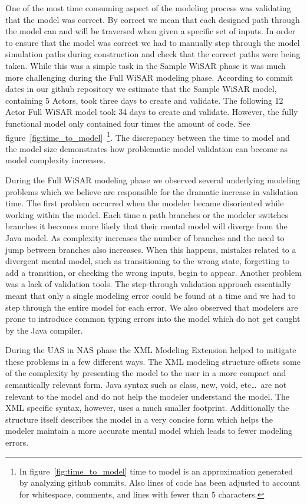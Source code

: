 One of the most time consuming aspect of the modeling process was validating that the model was correct.  By correct we mean that each designed path through the model can and will be traversed when given a specific set of inputs.  In order to ensure that the model was correct we had to manually step through the model simulation paths during construction and check that the correct paths were being taken.  While this was a simple task in the Sample WiSAR phase it was much more challenging during the Full WiSAR modeling phase.  According to commit dates in our github repository we estimate that the Sample WiSAR model, containing 5 Actors, took three days to create and validate.  The following 12 Actor Full WiSAR model took 34 days to create and validate.  However, the fully functional model only contained four times the amount of code.  See figure~\ref{fig:time_to_model}~\footnote{In figure~\ref{fig:time_to_model} time to model is an approximation generated by analyzing github commits.  Also lines of code has been adjusted to account for whitespace, comments, and lines with fewer than 5 characters.}.  The discrepancy between the time to model and the model size demonstrates how problematic model validation can become as model complexity increases.

During the Full WiSAR modeling phase we observed several underlying modeling problems which we believe are responsible for the dramatic increase in validation time.  The first problem occurred when the modeler became disoriented while working within the model.  Each time a path branches or the modeler switches branches it becomes more likely that their mental model will diverge from the Java model.  As complexity increases the number of branches and the need to jump between branches also increases.  When this happens, mistakes related to a divergent mental model, such as transitioning to the wrong state, forgetting to add a transition, or checking the wrong inputs, begin to appear.  Another problem was a lack of validation tools.  The step-through validation approach essentially meant that only a single modeling error could be found at a time and we had to step through the entire model for each error.  We also observed that modelers are prone to introduce common typing errors into the model which do not get caught by the Java compiler.  

During the UAS in NAS phase the XML Modeling Extension helped to mitigate these problems in a few different ways.  The XML modeling structure offsets some of the complexity by presenting the model to the user in a more compact and semantically relevant form.  Java syntax such as class, new, void, etc\ldots~are not relevant to the model and do not help the modeler understand the model.  The XML specific syntax, however, uses a much smaller footprint.  Additionally the structure itself describes the model in a very concise form which helps the modeler maintain a more accurate mental model which leads to fewer modeling errors.

